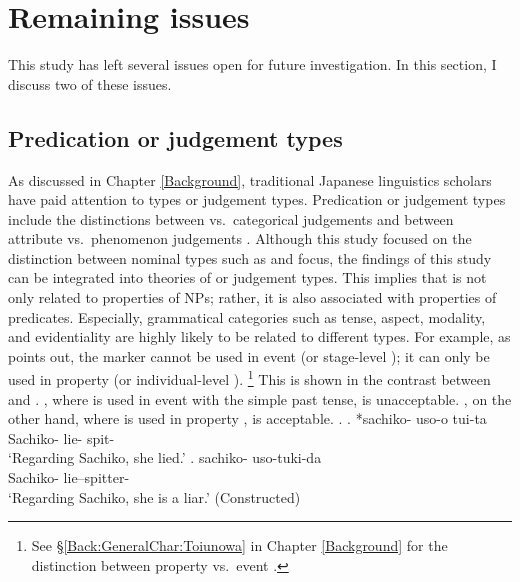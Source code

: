 \section{Remaining issues}

This study has left several issues open for future investigation. %
In this section, I discuss two of these issues.


\subsection{Predication or judgement types}

As discussed in Chapter \ref{Background},
traditional Japanese linguistics scholars have paid attention to
 types or judgement types.
Predication or judgement types include the distinctions between  vs.~categorical judgements and between attribute vs.~phenomenon judgements
\cite{matsushita28,yamada36,mio48,kuroda72,masuoka08,kageyama12}.
Although this study focused on the distinction between nominal types such as  and focus,
the findings of this study can be integrated into theories of  or judgement types.
This implies that  is not only related to properties of NPs;
rather, it is also associated with properties of predicates.
Especially, grammatical categories such as tense, aspect, modality, and evidentiality are highly likely to be related to different  types.
For example, as  points out,
the  marker  cannot be used in event  (or stage-level );
it can only be used in property  (or individual-level ).%
 \footnote{
 See \S \ref{Back:GeneralChar:Toiunowa} in Chapter \ref{Background}
 for the distinction between property vs.~event .
 }
This is shown in the contrast between \Next[a] and \Next[b].
\Next[a], where  is used in event  with the simple past tense,
is unacceptable.
\Next[b],
on the other hand, where  is used in property ,
is acceptable.
%
\ex.
 \ag. *sachiko- uso-o tui-ta \\
      Sachiko- lie- spit- \\
      `Regarding Sachiko, she lied.'
     \hfill{\cite[p.~96]{masuoka12}}
 \bg. sachiko- uso-tuki-da \\
      Sachiko- lie--spitter- \\
      `Regarding Sachiko, she is a liar.'
     \hfill{(Constructed)}

